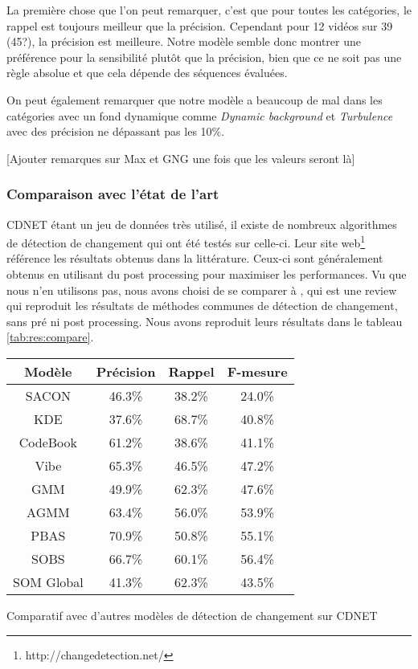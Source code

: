 	La première chose que l'on peut remarquer, c'est que pour toutes les catégories, le rappel est toujours meilleur que la précision. Cependant pour 12 vidéos sur 39 (45?), la précision est meilleure. Notre modèle semble donc montrer une préférence pour la sensibilité plutôt que la précision, bien que ce ne soit pas une règle absolue et que cela dépende des séquences évaluées. 

	On peut également remarquer que notre modèle a beaucoup de mal dans les catégories avec un fond dynamique comme \textit{Dynamic background} et \textit{Turbulence} avec des précision ne dépassant pas les 10\%.

	[Ajouter remarques sur Max et GNG une fois que les valeurs seront là]

	\subsubsection{Comparaison avec l'état de l'art}

	CDNET étant un jeu de données très utilisé, il existe de nombreux algorithmes de détection de changement qui ont été testés sur celle-ci. Leur site web\footnote{http://changedetection.net/} référence les résultats obtenus dans la littérature. Ceux-ci sont généralement obtenus en utilisant du post processing pour maximiser les performances. Vu que nous n'en utilisons pas, nous avons choisi de se comparer à \cite{xu2016background}, qui est une review qui reproduit les résultats de méthodes communes de détection de changement, sans pré ni post processing. Nous avons reproduit leurs résultats dans le tableau \ref{tab:res:compare}.

	\begin{tableth}
    \begin{tabular}{|c|ccc|}
		\hline
		Modèle & Précision & Rappel & F-mesure\\
		\hline
		SACON & 46.3\% & 38.2\% & 24.0\%\\
		KDE & 37.6\% & 68.7\% & 40.8\%\\
		CodeBook & 61.2\% & 38.6\% & 41.1\% \\
		Vibe & 65.3\% & 46.5\% & 47.2\% \\
		GMM & 49.9\% & 62.3\% & 47.6\% \\
		AGMM & 63.4\% & 56.0\% & 53.9\% \\
		PBAS & 70.9\% & 50.8\% & 55.1\% \\
		SOBS & 66.7\% & 60.1\% & 56.4\% \\
		\hline
		SOM Global & 41.3\% & 62.3\% & 43.5\% \\
		\hline
	\end{tabular}
	\caption{Comparatif avec d'autres modèles de détection de changement sur CDNET}
	\label{tab:res:compare}
	\end{tableth}

